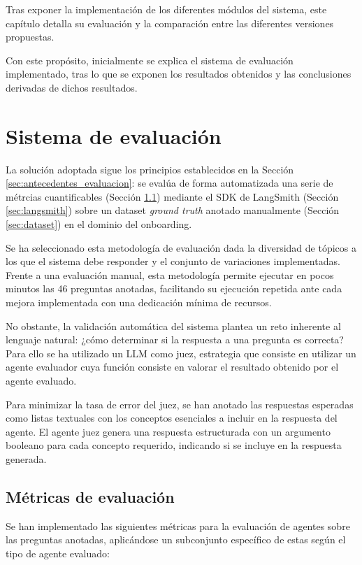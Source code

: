Tras exponer la implementación de los diferentes módulos del sistema, este capítulo detalla su evaluación y la comparación entre las diferentes versiones propuestas.

Con este propósito, inicialmente se explica el sistema de evaluación implementado, tras lo que se exponen los resultados obtenidos y las conclusiones derivadas de dichos resultados. 

\section{Sistema de evaluación}
La solución adoptada sigue los principios establecidos en la Sección \ref{sec:antecedentes_evaluacion}: se evalúa de forma automatizada una serie de métrcias cuantificables (Sección \ref{sec:metricas}) mediante el SDK de LangSmith (Sección \ref{sec:langsmith}) sobre un dataset \textit{ground truth} anotado manualmente (Sección \ref{sec:dataset}) en el dominio del onboarding.

Se ha seleccionado esta metodología de evaluación dada la diversidad de tópicos a los que el sistema debe responder y el conjunto de variaciones implementadas. Frente a una evaluación manual, esta metodología permite ejecutar en pocos minutos las 46 preguntas anotadas, facilitando su ejecución repetida ante cada mejora implementada con una dedicación mínima de recursos.

No obstante, la validación automática del sistema plantea un reto inherente al lenguaje natural: ¿cómo determinar si la respuesta a una pregunta es correcta? Para ello se ha utilizado un LLM como juez, estrategia que consiste en utilizar un agente evaluador cuya función consiste en valorar el resultado obtenido por el agente evaluado.

Para minimizar la tasa de error del juez, se han anotado las respuestas esperadas como listas textuales con los conceptos esenciales a incluir en la respuesta del agente. El agente juez genera una respuesta estructurada con un argumento booleano para cada concepto requerido, indicando si se incluye en la respuesta generada. 

\subsection{Métricas de evaluación}
\label{sec:metricas}
Se han implementado las siguientes métricas para la evaluación de agentes sobre las preguntas anotadas, aplicándose un subconjunto específico de estas según el tipo de agente evaluado:

